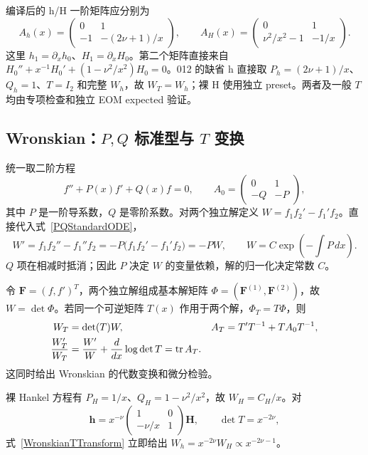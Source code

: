 ﻿\documentclass[a4paper,11pt]{article}
\begin{document}
编译后的 h/H 一阶矩阵应分别为
\begin{equation}
 A_h(x)=
 \begin{pmatrix}0&1\\-1&-(2\nu+1)/x\end{pmatrix},
 \qquad
 A_H(x)=
 \begin{pmatrix}0&1\\\nu^2/x^2-1&-1/x\end{pmatrix}.
 \label{hH2x2Presets}
\end{equation}
这里 $h_1=\partial_xh_0$、$H_1=\partial_xH_0$。第二个矩阵直接来自
$H_0''+x^{-1}H_0'+(1-\nu^2/x^2)H_0=0$。012 的缺省 h 直接取 $P_h=(2\nu+1)/x$、$Q_h=1$、$T=I_2$ 和完整 $W_h$，故 $W_T=W_h$；裸 H 使用独立 preset。两者及一般 $T$ 均由专项检查和独立 EOM expected 验证。

\subsection{Wronskian：$P,Q$ 标准型与 $T$ 变换}
\label{wronskianPQTransform}

统一取二阶方程
\begin{equation}
 f''+P(x)f'+Q(x)f=0,
 \qquad
 A_0=\begin{pmatrix}0&1\\-Q&-P\end{pmatrix},
 \label{PQStandardODE}
\end{equation}
其中 $P$ 是一阶导系数，$Q$ 是零阶系数。对两个独立解定义
$W=f_1f_2'-f_1'f_2$。直接代入式~\eqref{PQStandardODE}，
\begin{equation}
 W'=f_1f_2''-f_1''f_2=-P\bigl(f_1f_2'-f_1'f_2\bigr)=-PW,
 \qquad
 W=C\exp\!\left(-\int P\,dx\right).
 \label{AbelPQ}
\end{equation}
$Q$ 项在相减时抵消；因此 $P$ 决定 $W$ 的变量依赖，解的归一化决定常数 $C$。

令 $\mathbf F=(f,f')^T$，两个独立解组成基本解矩阵
$\Phi=(\mathbf F^{(1)},\mathbf F^{(2)})$，故 $W=\det\Phi$。若同一个可逆矩阵 $T(x)$ 作用于两个解，$\Phi_T=T\Phi$，则
\begin{align}
 W_T&=\det(T)W,
 & A_T&=T'T^{-1}+TA_0T^{-1}, \notag\\
 \frac{W_T'}{W_T}
 &=\frac{W'}{W}+\frac{d}{dx}\log\det T
 =\operatorname{tr}A_T.
 \label{WronskianTTransform}
\end{align}
这同时给出 Wronskian 的代数变换和微分检验。

裸 Hankel 方程有 $P_H=1/x$、$Q_H=1-\nu^2/x^2$，故 $W_H=C_H/x$。对
\begin{equation}
 \mathbf h=x^{-\nu}
 \begin{pmatrix}1&0\\-\nu/x&1\end{pmatrix}\mathbf H,
 \qquad \det T=x^{-2\nu},
\end{equation}
式~\eqref{WronskianTTransform} 立即给出 $W_h=x^{-2\nu}W_H\propto x^{-2\nu-1}$。
\end{document}
